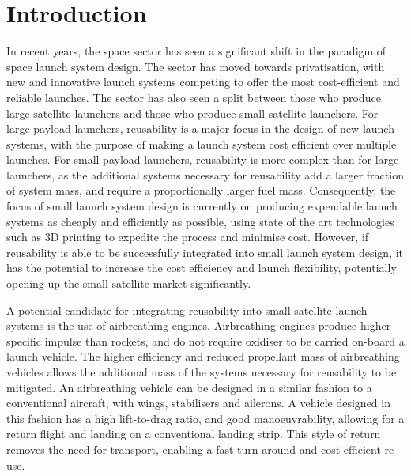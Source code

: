 
\cleardoublepage
\chapter{Introduction}


  

  		
  	In recent years, the space sector has seen a significant shift in the paradigm of space launch system design. 
  	The sector has moved towards privatisation, with new and innovative launch systems competing to offer the most cost-efficient and reliable launches. 
  	The sector has also seen a split between those who produce large satellite launchers and those who produce small satellite launchers.
  	For large payload launchers, reusability is a major focus in the design of new launch systems, with the purpose of making a launch system cost efficient over multiple launches\cite{Faa2018}. 
  	For small payload launchers, reusability is more complex than for large launchers, as the additional systems necessary for reusability add a larger fraction of system mass, and require a proportionally larger fuel mass. 
  	Consequently, the focus of small launch system design is currently on producing expendable launch systems as cheaply and efficiently as possible, using state of the art technologies such as 3D printing to expedite the process and minimise cost\cite{Niederstrasser2015}.
  	However, if reusability is able to be successfully integrated into small launch system design, it has the potential to increase the cost efficiency and launch flexibility, potentially opening up the small satellite market significantly. 
  	
  	
  	
  	A potential candidate for integrating reusability into small satellite launch systems is the use of airbreathing engines\cite{Smart2009a,Ketsdever2010}.
Airbreathing engines produce higher specific impulse than rockets, and do not require oxidiser to be carried on-board a launch vehicle\cite{Smart2010}.  	 
  	The higher efficiency and reduced propellant mass of airbreathing vehicles allows the additional mass of the systems necessary for reusability to be mitigated\cite{Curran2003}. An airbreathing vehicle can be designed in a similar fashion to a conventional aircraft, with wings, stabilisers and ailerons\cite{Shaughnessy1990,Preller2017b}. A vehicle designed in this fashion has a high lift-to-drag ratio, and good manoeuvrability, allowing for a return flight and landing on a conventional landing strip\cite{Preller2017b}. This style of return removes the need for transport, enabling a fast turn-around and cost-efficient re-use. 
  	
